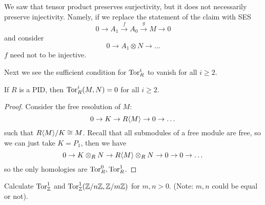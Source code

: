 \begin{warn}
    We saw that tensor product preserves surjectivity, but it does not necessarily preserve injectivity. Namely, if we replace the statement of the claim with SES 
    \begin{equation*}
        0\to A_1\xrightarrow{f}A_0\xrightarrow{g}M\to 0
    \end{equation*}
    and consider 
    \begin{equation*}
        0\to A_1\otimes N\to\dots
    \end{equation*}
    $f$ need not to be injective.
\end{warn}
Next we see the sufficient condition for $\text{Tor}_R^i$ to vanish for all $i\geq 2$.
\begin{cor}
    If $R$ is a PID, then $\text{Tor}_R^i(M,N)=0$ for all $i\geq 2$.
\end{cor}
\begin{proof}
    Consider the free resolution of $M$:
    \begin{equation*}
        0\to K\to R\langle M\rangle\to 0\to\dots
    \end{equation*}
    such that $R\langle M\rangle/K\cong M$.
    Recall that all submodules of a free module are free, so we can just take $K=P_1$, then we have 
    \begin{equation*}
        0\to K\otimes_RN\to R\langle M\rangle\otimes_RN\to 0\to 0\to\dots
    \end{equation*}
    so the only homologies are $\text{Tor}_R^0, \text{Tor}_R^1$.
\end{proof}
\begin{prob}[HW(2.4)]
    Calculate $\text{Tor}_{\mathbb{Z}}^1$ and $\text{Tor}_{\mathbb{Z}}^1(\mathbb{Z}/n\mathbb{Z},\mathbb{Z}/m\mathbb{Z})$ for $m,n>0$. (Note: $m,n$ could be equal or not).
\end{prob}





